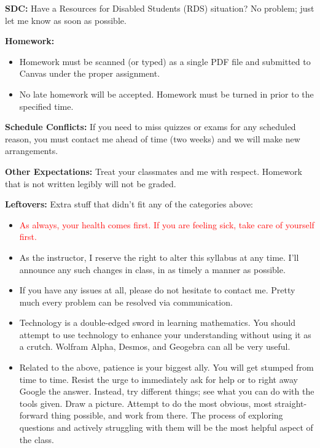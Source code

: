 \documentclass[12pt]{amsbook}
\begin{document}
\textbf{SDC:} Have a Resources for Disabled Students (RDS) situation? No problem; just let me know as soon as possible.

\textbf{Homework:} 
\begin{itemize}
    \item Homework must be scanned (or typed) as a single PDF file and submitted to Canvas under the proper assignment.
    \item No late homework will be accepted.  Homework must be turned in prior to the specified time.
\end{itemize}

\textbf{Schedule Conflicts:} If you need to miss quizzes or exams for any scheduled reason, you must contact me ahead of time (two weeks) and we will make new arrangements. 

\textbf{Other Expectations:} Treat your classmates and me with respect. Homework that is not written legibly will not be graded.

\textbf{Leftovers:} Extra stuff that didn't fit any of the categories above:
\begin{itemize}
\item \textcolor{red}{As always, your health comes first.  If you are feeling sick, take care of yourself first.}
\item As the instructor, I reserve the right to alter this syllabus at any time. I'll announce any such changes in class, in as timely a manner as possible. 
\item If you have any issues at all, please do not hesitate to contact me. Pretty much every  problem can be resolved via communication.
\item Technology is a double-edged sword in learning mathematics. You should attempt to use technology to enhance your understanding without using it as a crutch. Wolfram Alpha, Desmos, and Geogebra can all be very useful. 
\item Related to the above, patience is your biggest ally. You will get stumped from time to time. Resist the urge to immediately ask for help or to right away Google the answer. Instead, try different things; see what you can do with the tools given. Draw a picture. Attempt to do the most obvious, most straight-forward thing possible, and work from there. The process of exploring questions and actively struggling with them will be the most helpful aspect of the class.
\end{itemize}
\end{document}
